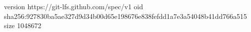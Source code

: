 version https://git-lfs.github.com/spec/v1
oid sha256:927830ba5ae327d9d34b00d65e198676e838fefdd1a7e3a54048b41dd766a515
size 1048672
